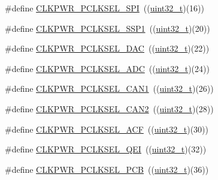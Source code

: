 \begin{DoxyCompactItemize}
\item 
\#define \hyperlink{group___c_l_k_p_w_r___public___macros_gab9cf1de13d64711004e44ed10356c9a6}{C\+L\+K\+P\+W\+R\+\_\+\+P\+C\+L\+K\+S\+E\+L\+\_\+\+S\+PI}~((\hyperlink{_p_e___types_8h_a33594304e786b158f3fb30289278f5af}{uint32\+\_\+t})(16))
\item 
\#define \hyperlink{group___c_l_k_p_w_r___public___macros_ga67471573e91ebf70da511d54d4a7c808}{C\+L\+K\+P\+W\+R\+\_\+\+P\+C\+L\+K\+S\+E\+L\+\_\+\+S\+S\+P1}~((\hyperlink{_p_e___types_8h_a33594304e786b158f3fb30289278f5af}{uint32\+\_\+t})(20))
\item 
\#define \hyperlink{group___c_l_k_p_w_r___public___macros_gad78e9911438a7b9006e89a11ab747de5}{C\+L\+K\+P\+W\+R\+\_\+\+P\+C\+L\+K\+S\+E\+L\+\_\+\+D\+AC}~((\hyperlink{_p_e___types_8h_a33594304e786b158f3fb30289278f5af}{uint32\+\_\+t})(22))
\item 
\#define \hyperlink{group___c_l_k_p_w_r___public___macros_ga842dc1922e983d1eaff58fced88f79f0}{C\+L\+K\+P\+W\+R\+\_\+\+P\+C\+L\+K\+S\+E\+L\+\_\+\+A\+DC}~((\hyperlink{_p_e___types_8h_a33594304e786b158f3fb30289278f5af}{uint32\+\_\+t})(24))
\item 
\#define \hyperlink{group___c_l_k_p_w_r___public___macros_ga9965dea28c73dfce6c594edde50fe70c}{C\+L\+K\+P\+W\+R\+\_\+\+P\+C\+L\+K\+S\+E\+L\+\_\+\+C\+A\+N1}~((\hyperlink{_p_e___types_8h_a33594304e786b158f3fb30289278f5af}{uint32\+\_\+t})(26))
\item 
\#define \hyperlink{group___c_l_k_p_w_r___public___macros_gabc314973cc2becbd8cfcf4f4813c6dd4}{C\+L\+K\+P\+W\+R\+\_\+\+P\+C\+L\+K\+S\+E\+L\+\_\+\+C\+A\+N2}~((\hyperlink{_p_e___types_8h_a33594304e786b158f3fb30289278f5af}{uint32\+\_\+t})(28))
\item 
\#define \hyperlink{group___c_l_k_p_w_r___public___macros_gaf5e32f4e62e29f6ebc2c4f32fa3121ce}{C\+L\+K\+P\+W\+R\+\_\+\+P\+C\+L\+K\+S\+E\+L\+\_\+\+A\+CF}~((\hyperlink{_p_e___types_8h_a33594304e786b158f3fb30289278f5af}{uint32\+\_\+t})(30))
\item 
\#define \hyperlink{group___c_l_k_p_w_r___public___macros_gacdf0446e521b6cdec979ffece2ba73f5}{C\+L\+K\+P\+W\+R\+\_\+\+P\+C\+L\+K\+S\+E\+L\+\_\+\+Q\+EI}~((\hyperlink{_p_e___types_8h_a33594304e786b158f3fb30289278f5af}{uint32\+\_\+t})(32))
\item 
\#define \hyperlink{group___c_l_k_p_w_r___public___macros_gad35b3535118164485e75806a6ef1f6e6}{C\+L\+K\+P\+W\+R\+\_\+\+P\+C\+L\+K\+S\+E\+L\+\_\+\+P\+CB}~((\hyperlink{_p_e___types_8h_a33594304e786b158f3fb30289278f5af}{uint32\+\_\+t})(36))
\item 

\end{DoxyCompactItemize}
